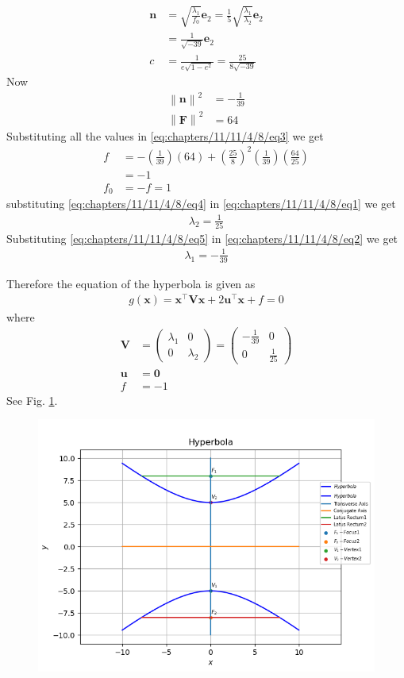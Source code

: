 \documentclass[12pt]{article}
\providecommand{\brak}[1]{\ensuremath{\left(#1\right)}}
\providecommand{\norm}[1]{\left\lVert#1\right\rVert}
\newcommand{\myvec}[1]{\ensuremath{\begin{pmatrix}#1\end{pmatrix}}}
\let\vec\mathbf
\begin{document}
\begin{enumerate}
\begin{align}
	\vec{n} &= \sqrt{\frac{\lambda_1}{f_0}}\vec{e}_2 = \frac{1}{5}\sqrt{\frac{\lambda_1}{\lambda_2}}\vec{e}_2\\
	        &= \frac{1}{\sqrt{-39}}\vec{e}_2\\
	c &= \frac{1}{e\sqrt{1-e^2}} = \frac{25}{8\sqrt{-39}}	
\end{align}
Now
\begin{align}
	\norm{\vec{n}}^2 &= -\frac{1}{39}\\
	\norm{\vec{F}}^2 &= 64
\end{align}
Substituting all the values in \eqref{eq:chapters/11/11/4/8/eq3} we get
\begin{align}
	f &= -\brak{\frac{1}{39}}\brak{64} + \brak{\frac{25}{8}}^2 \brak{\frac{1}{39}} \brak{\frac{64}{25}}\\
	  &= -1\\
	\label{eq:chapters/11/11/4/8/eq4}  
	f_0  &= -f = 1
\end{align}
substituting \eqref{eq:chapters/11/11/4/8/eq4} in \eqref{eq:chapters/11/11/4/8/eq1} we get
\begin{align}
	\label{eq:chapters/11/11/4/8/eq5}
	\lambda_2 = \frac{1}{25} 
\end{align}
Substituting \eqref{eq:chapters/11/11/4/8/eq5} in \eqref{eq:chapters/11/11/4/8/eq2} we get
\begin{align}
	\lambda_1 = -\frac{1}{39}
\end{align}
\end{enumerate}
Therefore the equation of the hyperbola is given as
\begin{align}
	g\brak{\vec{x}}=\vec{x}^\top \vec{V} \vec{x} + 2\vec{u}^\top \vec{x} + f = 0
\end{align}
where
\begin{align}
	\vec{V} &= \myvec{\lambda_1&0\\0&\lambda_2} = \myvec{-\frac{1}{39}&0\\0&\frac{1}{25}}\\
	\vec{u} &= \vec{0}\\
	f &= -1
\end{align}
See Fig. \ref{fig:chapters/11/11/4/8/Fig1}.
\begin{figure}[!h]
	\begin{center} 
	    \includegraphics[width=\columnwidth]{chapters/11/11/4/8/figs/hyperbola2}
	\end{center}
\caption{}
\label{fig:chapters/11/11/4/8/Fig1}
\end{figure}
\end{document}
